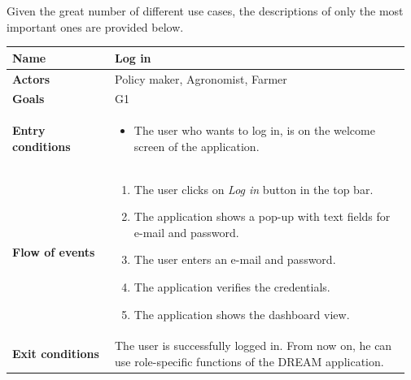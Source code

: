 
Given the great number of different use cases, the descriptions of only the most important ones are provided below.

\begin{table}[H]
    \centering
	\begin{tabular}{@{}p{0.25\linewidth} p{0.72\linewidth}@{}}
\toprule
		\textbf{Name}               & Log in\\
		\midrule
		\textbf{Actors}             & Policy maker, Agronomist, Farmer\\
		\midrule
		\textbf{Goals}              & G1 \\
		\midrule
		
		\textbf{Entry conditions}   & \begin{itemize}[leftmargin=.4cm,noitemsep,topsep=0pt,before=\vspace{-3mm},after=\vspace{-4mm}]
		    \item The user who wants to log in, is  on the welcome screen of the application.
		\end{itemize}\\
		\midrule
		
		\textbf{Flow of events}     & \begin{enumerate}[leftmargin=.4cm,noitemsep,topsep=0pt,before=\vspace{-3mm},after=\vspace{-4mm}]
		    \item The user clicks on \textit{Log in} button in the top bar.
		    \item The application shows a pop-up with text fields for e-mail and password.
		    \item The user enters an e-mail and password.
		    \item The application verifies the credentials.
		    \item The application shows the dashboard view.
		\end{enumerate}\\
		\midrule
		\textbf{Exit conditions}    & The user is successfully logged in. From now on, he can use role-specific functions of the DREAM application. \\
		\midrule
		

\end{tabular}
\end{table}
